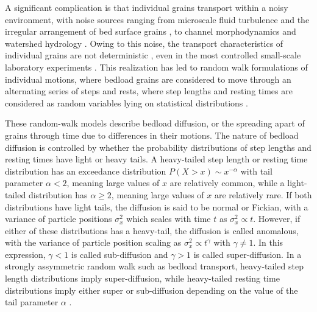 \documentclass[draft]{agujournal2018}
\begin{document}
A significant complication is that individual grains transport within a noisy environment, with noise sources ranging from microscale fluid turbulence \citep{Celik2014} and the irregular arrangement of bed surface grains \citep{Heyman2019}, to channel morphodynamics \citep{Hassan2017} and watershed hydrology \citep{Phillips2013}.
Owing to this noise, the transport characteristics of individual grains are not deterministic \citep[e.g.][]{Einstein1937}, even in the most controlled small-scale laboratory experiments \citep[e.g.][]{Fathel2015, Heyman2016}.
This realization has led to random walk formulations of individual motions, where bedload grains are considered to move through an alternating series of steps and rests, where step lengths and resting times are considered as random variables lying on statistical distributions \citep{Einstein1937, Yano1969, Nakagawa1976, Hassan1991, Bradley2012}.

These random-walk models describe bedload diffusion, or the spreading apart of grains through time due to differences in their motions.
The nature of bedload diffusion is controlled by whether the probability distributions of step lengths and resting times have light or heavy tails.
A heavy-tailed step length or resting time distribution has an exceedance distribution $P(X>x) \sim x^{-\alpha}$ with tail parameter $\alpha < 2$, meaning large values of $x$ are relatively common, while a light-tailed distribution has $\alpha \geq 2$, meaning large values of $x$ are relatively rare.
If both distributions have light tails, the diffusion is said to be normal or Fickian, with a variance of particle positions $\sigma_x^2$ which scales with time $t$ as $\sigma_x^2 \propto t$.
However, if either of these distributions has a heavy-tail, the diffusion is called anomalous, with the variance of particle position scaling as $\sigma_x^2 \propto t^\gamma$ with $\gamma\neq 1$.
In this expression, $\gamma <1$ is called sub-diffusion and $\gamma > 1$ is called super-diffusion.
In a strongly assymmetric random walk such as bedload transport, heavy-tailed step length distributions imply super-diffusion, while heavy-tailed resting time distributions imply either super or sub-diffusion depending on the value of the tail parameter $\alpha$ \citep{Weeks1996, Weeks1998}.
\end{document}
